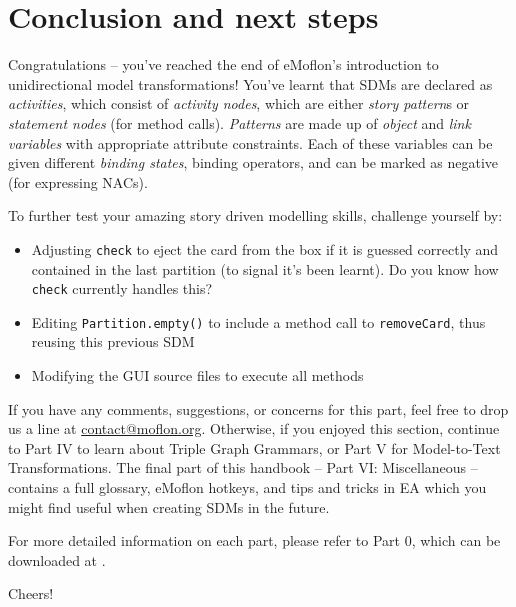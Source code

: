 \genHeader
\section{Conclusion and next steps}

\vspace{0.5cm}

Congratulations -- you've reached the end of eMoflon's introduction to unidirectional model transformations! You've learnt that SDMs are declared as
\emph{activities}, which consist of \emph{activity nodes}, which are either \emph{story pattern}s or \emph{statement nodes} (for method calls).
\emph{Patterns} are made up of \emph{object} and \emph{link variables} with appropriate attribute constraints. Each of these variables can be given
different \emph{binding states}, binding operators, and can be marked as negative (for expressing NACs).

\vspace{0.5cm}

To further test your amazing story driven modelling skills, challenge yourself by:
\begin{itemize}
\item Adjusting \texttt{check} to eject the card from the box if it is guessed correctly and contained in the last partition (to signal it's been learnt). Do
you know how \texttt{check} currently handles this?
\item Editing \texttt{Partition.empty()} to include a method call to \texttt{removeCard}, thus reusing this previous SDM
\item Modifying the GUI source files to execute all methods
\end{itemize}

\vspace{0.5cm}
	
If you have any comments, suggestions, or concerns for this part, feel free to drop us a line at \href{mailto:contact@moflon.org}{contact@moflon.org}.
Otherwise, if you enjoyed this section, continue to Part IV to learn about Triple Graph Grammars, or Part V for Model-to-Text Transformations.
The final part of this handbook -- Part VI: Miscellaneous -- contains a full glossary, eMoflon hotkeys, and tips and tricks in EA which you might find
useful when creating SDMs in the future.

For more detailed information on each part, please refer to Part 0, which can be downloaded at \dlPartZero.
\vspace{0.5cm}

Cheers!
